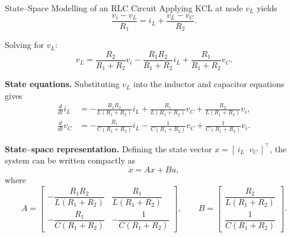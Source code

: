\begin{examplebox}{State--Space Modelling of an RLC Circuit}
	Applying KCL at node $v_L$ yields
	\[
	\frac{v_i - v_L}{R_1} = i_L + \frac{v_L - v_C}{R_2}.
	\]
	
	Solving for $v_L$:
	\[
	v_L =
	\frac{R_2}{R_1 + R_2} v_i
	- \frac{R_1 R_2}{R_1 + R_2} i_L
	+ \frac{R_1}{R_1 + R_2} v_C .
	\]
	
	\medskip
	\textbf{State equations.}
	Substituting $v_L$ into the inductor and capacitor equations gives
	\begin{align}
		 \frac{d}{dt}{i}_L &=
		-\frac{R_1 R_2}{L(R_1 + R_2)} i_L
		+ \frac{R_1}{L(R_1 + R_2)} v_C
		+ \frac{R_2}{L(R_1 + R_2)} v_i, \\[6pt]
		 \frac{d}{dt}{v}_C &=
		-\frac{R_1}{C(R_1 + R_2)} i_L
		-\frac{1}{C(R_1 + R_2)} v_C
		+ \frac{1}{C(R_1 + R_2)} v_i.
	\end{align}
	
	\medskip
	\textbf{State--space representation.}
	Defining the state vector $x = [\, i_L \;\; v_C \,]^\top$, the system can be written compactly as
	\[
	\dot{x} = A x + B u,
	\]
	where
	\[
	A =
	\begin{bmatrix}
		-\dfrac{R_1 R_2}{L(R_1 + R_2)} & \dfrac{R_1}{L(R_1 + R_2)} \\[8pt]
		-\dfrac{R_1}{C(R_1 + R_2)} & -\dfrac{1}{C(R_1 + R_2)}
	\end{bmatrix},
	\qquad
	B =
	\begin{bmatrix}
		\dfrac{R_2}{L(R_1 + R_2)} \\[8pt]
		\dfrac{1}{C(R_1 + R_2)}
	\end{bmatrix}.
	\]

\end{examplebox}



